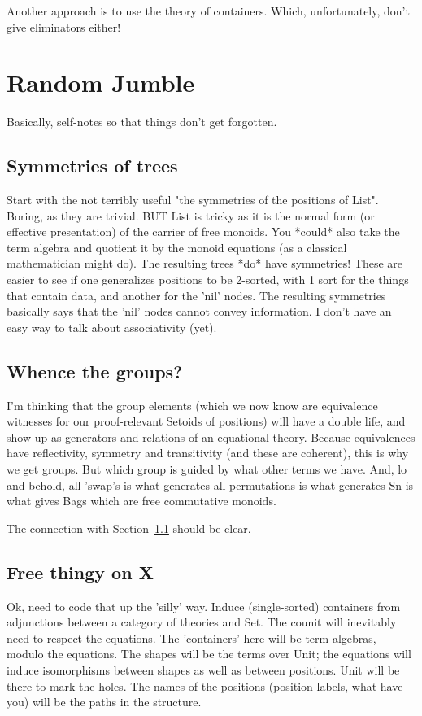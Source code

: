 \documentclass{article} %
\theoremstyle{plain}
\theoremstyle{definition}
\begin{document}
Another approach is to use the theory of containers. Which, unfortunately,
don't give eliminators either!

\section{Random Jumble}

Basically, self-notes so that things don't get forgotten.

\subsection{Symmetries of trees}
\label{sec:sym-trees}

Start with the not terribly useful "the symmetries of the positions of List".
Boring, as they are trivial. BUT List is tricky as it is the normal form (or
effective presentation) of the carrier of free monoids. You *could* also take
the term algebra and quotient it by the monoid equations (as a classical
mathematician might do). The resulting trees *do* have symmetries! These are
easier to see if one generalizes positions to be 2-sorted, with 1 sort for the
things that contain data, and another for the 'nil' nodes. The resulting
symmetries basically says that the 'nil' nodes cannot convey information. I
don't have an easy way to talk about associativity (yet).  

\subsection{Whence the groups?}

I'm thinking that the group elements (which we now know are equivalence
witnesses for our proof-relevant Setoids of positions) will have a double life,
and show up as generators and relations of an equational theory. Because
equivalences have reflectivity, symmetry and transitivity (and these are
coherent), this is why we get groups. But which group is guided by what other
terms we have. And, lo and behold, all 'swap's is what generates all
permutations is what generates Sn is what gives Bags which are free commutative
monoids.

The connection with Section~\ref{sec:sym-trees} should be clear.

\subsection{Free thingy on X}

Ok, need to code that up the 'silly' way. Induce (single-sorted)
containers from adjunctions between a category of theories and Set.
The counit will inevitably need to respect the equations. The 'containers'
here will be term algebras, modulo the equations. The shapes will be the
terms over Unit; the equations will induce isomorphisms between shapes
as well as between positions.  Unit will be there to mark the holes. The
names of the positions (position labels, what have you) will be the paths
in the structure.
\end{document}

